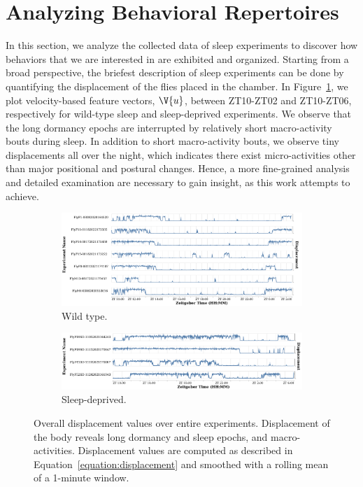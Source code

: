 \section{Analyzing Behavioral Repertoires}\label{section:analyzing-behavioral-repertoires}
In this section, we analyze the collected data of sleep experiments to discover how behaviors that we are interested in are exhibited and organized.
Starting from a broad perspective, the briefest description of sleep experiments can be done by quantifying the displacement of the flies placed in the chamber.
In Figure~\ref{figure:displacement}, we plot velocity-based feature vectors, $\V{u}$, between ZT10-ZT02 and ZT10-ZT06, respectively for wild-type sleep and sleep-deprived experiments.
We observe that the long dormancy epochs are interrupted by relatively short macro-activity bouts during sleep.
In addition to short macro-activity bouts, we observe tiny displacements all over the night, which indicates there exist micro-activities other than major positional and postural changes.
Hence, a more fine-grained analysis and detailed examination are necessary to gain insight, as this work attempts to achieve.

\begin{figure}[htb!]
	\centering
	\begin{subfigure}[b]{0.995\linewidth}
		\centering\includegraphics[width=\linewidth]{figures/Velocity-WT-1T.pdf}
		\caption{Wild type.}
	\end{subfigure}%

	\begin{subfigure}[b]{0.995\linewidth}
		\centering\includegraphics[width=\linewidth]{figures/Velocity-SD-1T.pdf}
		\caption{Sleep-deprived.}
	\end{subfigure}%
	\caption[Overall displacement values over entire experiments.]{Overall displacement values over entire experiments.
		Displacement of the body reveals long dormancy and sleep epochs, and macro-activities.
		Displacement values are computed as described in Equation~\ref{equation:displacement} and smoothed with a rolling mean of a 1-minute window.\label{figure:displacement}}
\end{figure}

